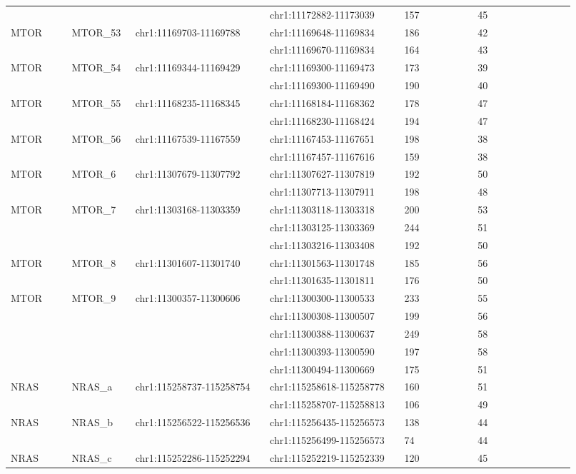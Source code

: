 \begin{landscape}
\begin{longtable}{p{0.1\linewidth}|p{0.1\linewidth}p{0.22\linewidth}p{0.22\linewidth}p{0.12\linewidth}p{0.16\linewidth}}
\\
 & & & chr1:11172882-11173039 & 157 & 45
\\
MTOR & MTOR\_53 & chr1:11169703-11169788 & chr1:11169648-11169834 & 186 & 42
\\
 & & & chr1:11169670-11169834 & 164 & 43
\\
MTOR & MTOR\_54 & chr1:11169344-11169429 & chr1:11169300-11169473 & 173 & 39
\\
 & & & chr1:11169300-11169490 & 190 & 40
\\
MTOR & MTOR\_55 & chr1:11168235-11168345 & chr1:11168184-11168362 & 178 & 47
\\
 & & & chr1:11168230-11168424 & 194 & 47
\\
MTOR & MTOR\_56 & chr1:11167539-11167559 & chr1:11167453-11167651 & 198 & 38
\\
 & & & chr1:11167457-11167616 & 159 & 38
\\
MTOR & MTOR\_6 & chr1:11307679-11307792 & chr1:11307627-11307819 & 192 & 50
\\
 & & & chr1:11307713-11307911 & 198 & 48
\\
MTOR & MTOR\_7 & chr1:11303168-11303359 & chr1:11303118-11303318 & 200 & 53
\\
 & & & chr1:11303125-11303369 & 244 & 51
\\
 & & & chr1:11303216-11303408 & 192 & 50
\\
MTOR & MTOR\_8 & chr1:11301607-11301740 & chr1:11301563-11301748 & 185 & 56
\\
 & & & chr1:11301635-11301811 & 176 & 50
\\
MTOR & MTOR\_9 & chr1:11300357-11300606 & chr1:11300300-11300533 & 233 & 55
\\
 & & & chr1:11300308-11300507 & 199 & 56
\\
 & & & chr1:11300388-11300637 & 249 & 58
\\
 & & & chr1:11300393-11300590 & 197 & 58
\\
 & & & chr1:11300494-11300669 & 175 & 51
\\
\hline
NRAS & NRAS\_a & chr1:115258737-115258754 & chr1:115258618-115258778 & 160 & 51
\\
 & & & chr1:115258707-115258813 & 106 & 49
\\
NRAS & NRAS\_b & chr1:115256522-115256536 & chr1:115256435-115256573 & 138 & 44
\\
 & & & chr1:115256499-115256573 & 74 & 44
\\
NRAS & NRAS\_c & chr1:115252286-115252294 & chr1:115252219-115252339 & 120 & 45
\\

\end{longtable}
\end{landscape}
